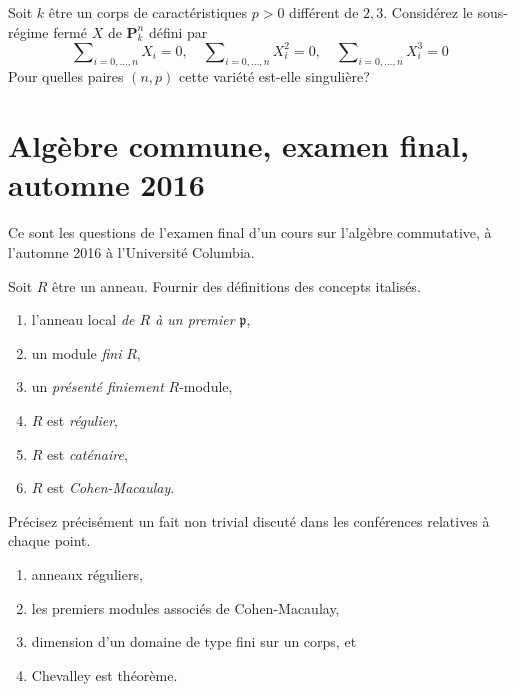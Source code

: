 \begin{exercise}
\label{exercise-vandermonde}
Soit $k$ être un corps de caractéristiques $p > 0$ différent
de $2,3$. Considérez le sous-régime fermé $X$ de $\mathbf{P}^n_k$ défini par
$$
\sum\nolimits_{i = 0, \ldots, n} X_i = 0,\quad
\sum\nolimits_{i = 0, \ldots, n} X_i^2 = 0,\quad
\sum\nolimits_{i = 0, \ldots, n} X_i^3 = 0
$$
Pour quelles paires $(n, p)$ cette variété est-elle singulière?
\end{exercise}






\section{Algèbre commune, examen final, automne 2016}
\label{section-final-exam-fall-2016}

\noindent
Ce sont les questions de l'examen final d'un
cours sur l'algèbre commutative, à l'automne 2016 à l'Université Columbia.

\begin{exercise}[Definitions]
\label{exercise-definitions-fall-2016}
Soit $R$ être
un anneau. Fournir des définitions des concepts italisés.
\begin{enumerate}
\item l'anneau local {\it de $R$ à un premier $\mathfrak p$},
\item un module {\it fini} $R$,
\item un {\it présenté finiement} $R$-module,
\item $R$ est {\it régulier},
\item $R$ est {\it caténaire},
\item $R$ est {\it Cohen-Macaulay}.
\end{enumerate}
\end{exercise}

\begin{exercise}[Theorems]
\label{exercise-results-fall-2016}
Précisez précisément un fait non trivial discuté dans les conférences relatives à
chaque point.
\begin{enumerate}
\item anneaux réguliers,
\item les premiers modules associés de Cohen-Macaulay,
\item dimension d'un domaine de type fini sur un corps, et
\item Chevalley est théorème.
\end{enumerate}
\end{exercise}


